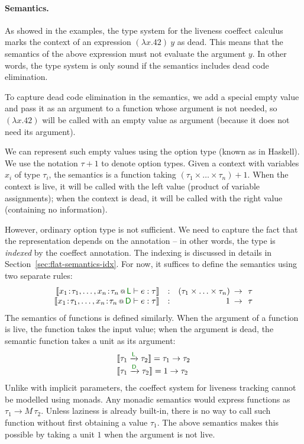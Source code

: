 \paragraph{Semantics.} 
As showed in the examples, the type system for the liveness coeffect calculus marks the context 
of an expression $(\lambda x.42)~y$ as dead. This means that the semantics of the above expression
must not evaluate the argument $y$. In other words, the type system is only sound if the semantics
includes dead code elimination.

To capture dead code elimination in the semantics, we add a special empty value and pass it as an
argument to a function whose argument is not needed, so $(\lambda x.42)$ will be called with 
an empty value as argument (because it does not need its argument).

We can represent such empty values using the option type (known as  in Haskell).
We use the notation $\tau + 1$ to denote option types. Given a context with variables $x_i$ of
type $\tau_i$, the semantics is a function taking $(\tau_1 \times \ldots \times \tau_n) + 1$.
When the context is live, it will be called with the left value (product of variable assignments);
when the context is dead, it will be called with the right value (containing no information).

However, ordinary option type is not sufficient. We need to capture the fact that the 
representation depends on the annotation -- in other words, the type is \emph{indexed} by 
the coeffect annotation. The indexing is discussed in details in Section~\ref{sec:flat-semantics-idx}. 
For now, it suffices to define the semantics using two separate rules:
%
\begin{equation*}
\begin{array}{rlrcl}
\sem{\coctx{x_1\!:\!\tau_1, \ldots, x_n\!:\!\tau_n}{ \cclrd{\ident{L}} } \vdash e : \tau} 
  &:& (\tau_1 \times \ldots \times \tau_n) &\narrow{\rightarrow}& \tau\\
\sem{\coctx{x_1\!:\!\tau_1, \ldots, x_n\!:\!\tau_n}{ \cclrd{\ident{D}} } \vdash e : \tau} 
  &:& 1 &\narrow{\rightarrow}& \tau
\end{array}
\end{equation*}
%
The semantics of functions is defined similarly. When the argument of a function is live, the function 
takes the input value; when the argument is dead, the semantic function takes a unit as its argument:
%
\begin{equation*}
\begin{array}{l}
\sem{\tau_1 \xrightarrow{\cclrd{\ident{L}}} \tau_2} = \tau_1 \rightarrow \tau_2\\
\sem{\tau_1 \xrightarrow{\cclrd{\ident{D}}} \tau_2} = 1 \rightarrow \tau_2
\end{array}
\end{equation*}
%
Unlike with implicit parameters, the coeffect system for liveness tracking cannot be modelled 
using monads. Any monadic semantics would express functions as $\tau_1 \rightarrow M\, \tau_2$.
Unless laziness is already built-in, there is no way to call such function without
first obtaining a value $\tau_1$. The above semantics makes this possible by taking a unit $1$ when
the argument is not live.


